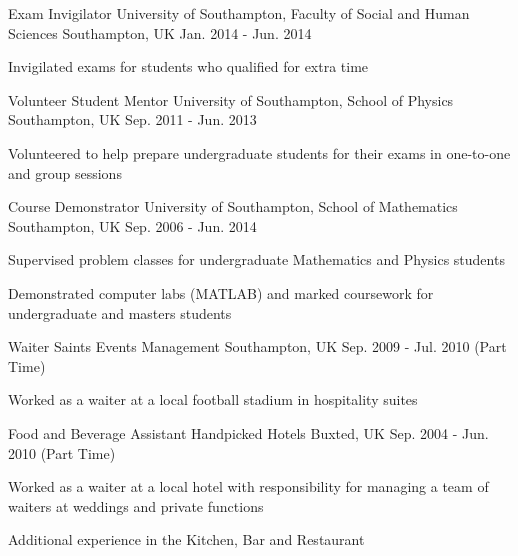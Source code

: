 \begin{cventries}
  \cventry
    {Exam Invigilator} %
    {University of Southampton, Faculty of Social and Human Sciences} %
    {Southampton, UK} %
    {Jan. 2014 - Jun. 2014} %
    {
      \begin{cvitems} %
        \item {Invigilated exams for students who qualified for extra time}
      \end{cvitems}
    }
       
  \cventry
    {Volunteer Student Mentor} %
    {University of Southampton, School of Physics} %
    {Southampton, UK} %
    {Sep. 2011 - Jun. 2013} %
    {
      \begin{cvitems} %
        \item {Volunteered to help prepare undergraduate students for their exams in one-to-one and group sessions}
      \end{cvitems}
    }

  \cventry
    {Course Demonstrator} %
    {University of Southampton, School of Mathematics} %
    {Southampton, UK} %
    {Sep. 2006 - Jun. 2014} %
    {
      \begin{cvitems} %
        \item {Supervised problem classes for undergraduate Mathematics and Physics students}
        \item {Demonstrated computer labs (MATLAB) and marked coursework for undergraduate and masters students}
      \end{cvitems}
    }

  \cventry
    {Waiter} %
    {Saints Events Management} %
    {Southampton, UK} %
    {Sep. 2009 - Jul. 2010 (Part Time) }%
    {
      \begin{cvitems} %
        \item {Worked as a waiter at a local football stadium in hospitality suites}
      \end{cvitems}
    }
 
  \cventry
    {Food and Beverage Assistant} %
    {Handpicked Hotels} %
    {Buxted, UK} %
    {Sep. 2004 - Jun. 2010 (Part Time)} %
    {
      \begin{cvitems} %
        \item {Worked as a waiter at a local hotel with responsibility for managing a team of waiters at weddings and private functions}
        \item{Additional experience in the Kitchen, Bar and Restaurant}
      \end{cvitems}
    }   
    

\end{cventries}
